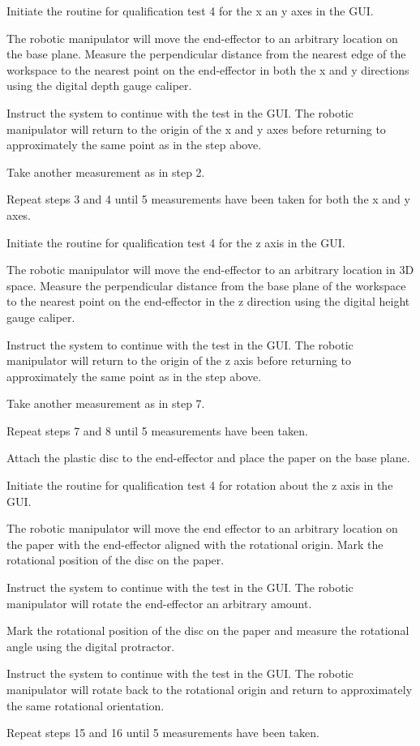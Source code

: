 \begin{compactenum}
    \item Initiate the routine for qualification test 4 for the x an y axes in the GUI.
    \item The robotic manipulator will move the end-effector to an arbitrary location on the base plane. Measure the perpendicular distance from the nearest edge of the workspace to the nearest point on the end-effector in both the x and y directions using the digital depth gauge caliper.
    \item Instruct the system to continue with the test in the GUI. The robotic manipulator will return to the origin of the x and y axes before returning to approximately the same point as in the step above.
    \item Take another measurement as in step 2.
    \item Repeat steps 3 and 4 until 5 measurements have been taken for both the x and y axes.
    \item Initiate the routine for qualification test 4 for the z axis in the GUI.
    \item The robotic manipulator will move the end-effector to an arbitrary location in 3D space. Measure the perpendicular distance from the base plane of the workspace to the nearest point on the end-effector in the z direction using the digital height gauge caliper.
    \item Instruct the system to continue with the test in the GUI. The robotic manipulator will return to the origin of the z axis before returning to approximately the same point as in the step above.
    \item Take another measurement as in step 7.
    \item Repeat steps 7 and 8 until 5 measurements have been taken.
    \item Attach the plastic disc to the end-effector and place the paper on the base plane.
    \item Initiate the routine for qualification test 4 for rotation about the z axis in the GUI.
    \item The robotic manipulator will move the end effector to an arbitrary location on the paper with the end-effector aligned with the rotational origin. Mark the rotational position of the disc on the paper.
    \item Instruct the system to continue with the test in the GUI. The robotic manipulator will rotate the end-effector an arbitrary amount.
    \item Mark the rotational position of the disc on the paper and measure the rotational angle using the digital protractor.
    \item Instruct the system to continue with the test in the GUI. The robotic manipulator will rotate back to the rotational origin and return to approximately the same rotational orientation.
    \item Repeat steps 15 and 16 until 5 measurements have been taken.
\end{compactenum}

